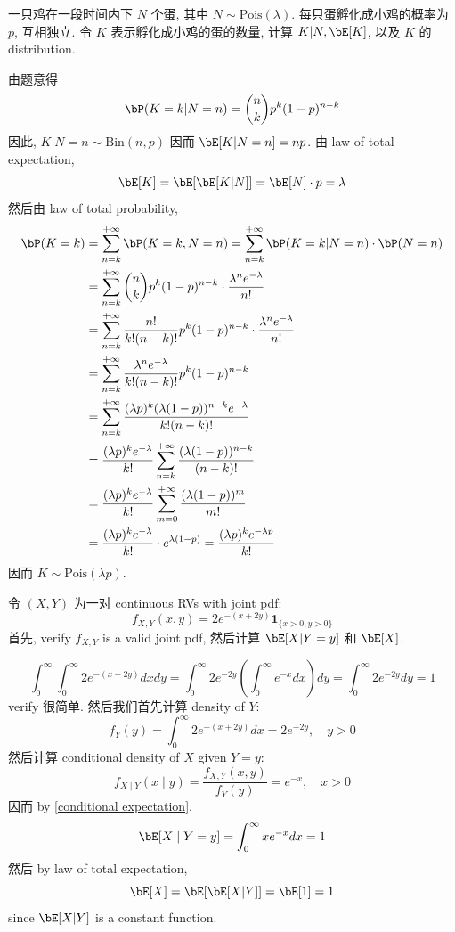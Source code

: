 \begin{example}
一只鸡在一段时间内下 \(N\) 个蛋, 其中 \(N \sim \text{Pois}(\lambda)\).
每只蛋孵化成小鸡的概率为 \(p\), 互相独立.
令 \(K\) 表示孵化成小鸡的蛋的数量, 计算 \(K|N, \bE[K]\), 以及 
\(K\) 的 distribution.
\begin{solution}
由题意得 \[
\bP(K=k | N=n) = \binom{n}{k} p^k (1-p)^{n-k}
\]
因此, \(K|N =n \sim \text{Bin}(n,p)\) 因而 \(\bE[K|N=n] = np\).
由 law of total expectation, 
\[
\bE[K] = \bE[\bE[K|N]] = \bE[N] \cdot p = \lambda 
\]
然后由 law of total probability,
\begin{align*}
\bP(K=k) &= \sum_{n=k}^{+\infty} \bP(K=k, N=n) 
= \sum_{n=k}^{+\infty} \bP(K=k | N=n) \cdot \bP(N=n) \\
&= \sum_{n=k}^{+\infty} \binom{n}{k} p^k (1-p)^{n-k} \cdot \frac{\lambda^n e^{-\lambda}}{n!} \\
&= \sum_{n=k}^{+\infty} \frac{n!}{k!(n-k)!} p^k (1-p)^{n-k} \cdot \frac{\lambda^n e^{-\lambda}}{n!} \\
&= \sum_{n=k}^{+\infty} \frac{\lambda^n e^{-\lambda}}{k!(n-k)!} p^k (1-p)^{n-k} \\
&= \sum_{n=k}^{+\infty} \frac{(\lambda p)^k (\lambda (1-p))^{n-k} e^{-\lambda}}{k!(n-k)!} \\
&= \frac{(\lambda p)^k e^{-\lambda}}{k!} \sum_{n=k}^{+\infty} \frac{(\lambda (1-p))^{n-k}}{(n-k)!} \\
&= \frac{(\lambda p)^k e^{-\lambda}}{k!} \sum_{m=0}^{+\infty} \frac{(\lambda (1-p))^m}{m!} \\
&= \frac{(\lambda p)^k e^{-\lambda}}{k!} \cdot e^{\lambda (1-p)} = \frac{(\lambda p)^k e^{-\lambda p}}{k!}
\end{align*}
因而 \(K \sim \text{Pois}(\lambda p)\).
\end{solution}
\end{example}


\begin{example}
令 \((X,Y)\) 为一对 continuous RVs with joint pdf:
\[
f_{X,Y}(x,y) = 2e^{-(x+2y)} \mathbf{1}_{ \{x>0, y>0\}}
\]
首先, verify \(f_{X,Y}\) is a valid joint pdf, 然后计算 
\(\bE[X|Y=y]\) 和 \(\bE[X]\).
\begin{solution}
\[
\int_0^{\infty} \int_0^{\infty} 2 e^{-(x+2 y)} d x d y=\int_0^{\infty} 2 e^{-2 y}\left(\int_0^{\infty} e^{-x} d x\right) d y=\int_0^{\infty} 2 e^{-2 y} d y=1
\]
verify 很简单. 然后我们首先计算 density of \(Y\):
\[
f_Y(y)=\int_0^{\infty} 2 e^{-(x+2 y)} d x=2 e^{-2 y}, \quad y>0
\]
然后计算 conditional density of \(X\) given \(Y=y\):
\[
f_{X \mid Y}(x \mid y)=\frac{f_{X, Y}(x, y)}{f_Y(y)}=e^{-x}, \quad x>0
\]
因而 by \ref{conditional expectation}, \[
\bE[X \mid Y=y]=\int_0^{\infty} x e^{-x} d x=1
\]
然后 by law of total expectation, \[
\bE[X] = \bE[\bE[X|Y]] = \bE[1] = 1
\] since \(\bE[X|Y]\) is a constant function.
\end{solution}
\end{example}